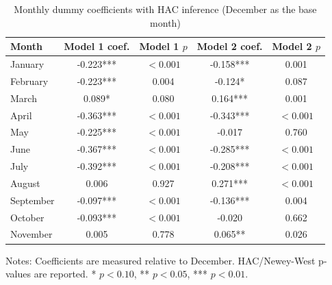 \begin{table}[H]
\centering
\caption{Monthly dummy coefficients with HAC inference (December as the base month)}
\label{tab:month-effects}
\small
\begin{tabular}{lcccc}
\toprule
Month & Model 1 coef. & Model 1 $p$ & Model 2 coef. & Model 2 $p$ \\
\midrule
January & -0.223*** & $<0.001$ & -0.158*** & 0.001 \\
February & -0.223*** & 0.004 & -0.124* & 0.087 \\
March & 0.089* & 0.080 & 0.164*** & 0.001 \\
April & -0.363*** & $<0.001$ & -0.343*** & $<0.001$ \\
May & -0.225*** & $<0.001$ & -0.017 & 0.760 \\
June & -0.367*** & $<0.001$ & -0.285*** & $<0.001$ \\
July & -0.392*** & $<0.001$ & -0.208*** & $<0.001$ \\
August & 0.006 & 0.927 & 0.271*** & $<0.001$ \\
September & -0.097*** & $<0.001$ & -0.136*** & 0.004 \\
October & -0.093*** & $<0.001$ & -0.020 & 0.662 \\
November & 0.005 & 0.778 & 0.065** & 0.026 \\
\bottomrule
\end{tabular}
\vspace{0.4em}
\begin{minipage}{0.94\textwidth}
\footnotesize
Notes: Coefficients are measured relative to December. HAC/Newey-West p-values are reported. * $p<0.10$, ** $p<0.05$, *** $p<0.01$.
\end{minipage}
\end{table}
